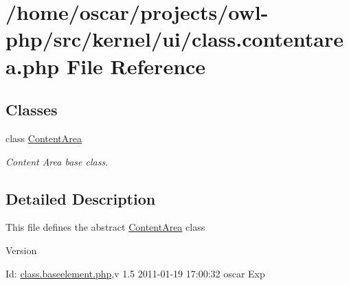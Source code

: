 \section{/home/oscar/projects/owl-\/php/src/kernel/ui/class.contentarea.php File Reference}
\label{class_8contentarea_8php}
\subsection*{Classes}
\begin{DoxyCompactItemize}
\item 
class \hyperlink{classContentArea}{ContentArea}
\begin{DoxyCompactList}\small\item\em Content Area base class. \item\end{DoxyCompactList}\end{DoxyCompactItemize}


\subsection{Detailed Description}
This file defines the abstract \hyperlink{classContentArea}{ContentArea} class \begin{DoxyVersion}{Version}

\end{DoxyVersion}
\begin{DoxyParagraph}{Id:}
\hyperlink{class_8baseelement_8php}{class.baseelement.php},v 1.5 2011-\/01-\/19 17:00:32 oscar Exp 
\end{DoxyParagraph}
